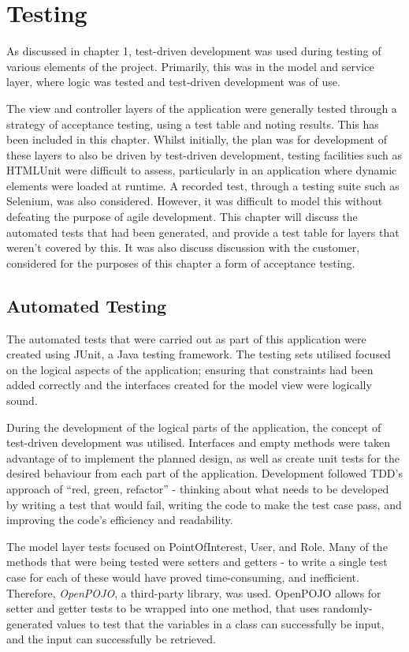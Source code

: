 \chapter{Testing}

As discussed in chapter 1, test-driven development was used during testing of various elements of the project. Primarily, this was in the model and service layer, where logic was tested and test-driven development was of use.

The view and controller layers of the application were generally tested through a strategy of acceptance testing, using a test table and noting results. This has been included in this chapter. Whilst initially, the plan was for development of these layers to also be driven by test-driven development, testing facilities such as HTMLUnit were difficult to assess, particularly in an application where dynamic elements were loaded at runtime. A recorded test, through a testing suite such as Selenium, was also considered. However, it was difficult to model this without defeating the purpose of agile development. This chapter will discuss the automated tests that had been generated, and provide a test table for layers that weren't covered by this. It was also discuss discussion with the customer, considered for the purposes of this chapter a form of acceptance testing.

\section{Automated Testing}

The automated tests that were carried out as part of this application were created using JUnit, a Java testing framework. The testing sets utilised focused on the logical aspects of the application; ensuring that constraints had been added correctly and the interfaces created for the model view were logically sound.

During the development of the logical parts of the application, the concept of test-driven development was utilised. Interfaces and empty methods were taken advantage of to implement the planned design, as well as create unit tests for the desired behaviour from each part of the application. Development followed TDD's approach of ``red, green, refactor'' - thinking about what needs to be developed by writing a test that would fail, writing the code to make the test case pass, and improving the code's efficiency and readability.

The model layer tests focused on PointOfInterest, User, and Role. Many of the methods that were being tested were setters and getters - to write a single test case for each of these would have proved time-consuming, and inefficient. Therefore, \textit{OpenPOJO}\cite{OpenPOJO}, a third-party library, was used. OpenPOJO allows for setter and getter tests to be wrapped into one method, that uses randomly-generated values to test that the variables in a class can successfully be input, and the input can successfully be retrieved.

